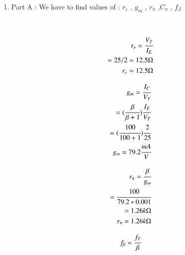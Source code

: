 \begin{enumerate}[label=\thesubsection.\arabic*.,ref=\thesubsection.\theenumi]
\item
Part A : We have to find values of :
 $r_{e}$ , $g_{m}$ , $r_{\pi}$ ,$C_{\pi}$ , $f_{\beta}$
 
\\

\solution

\begin{align}
   
   r_{e}  = \cfrac{V_{T}}{I_{E}}\\ 
          
          
          = 25/2  
          
          
          = 12.5\ohm \\
        
  
  r_{e} = 12.5 \ohm
    
\end{align}

\begin{align}

g_{m}   = \cfrac{I_{C}}{V_{T}}\\ 
        
        = (\cfrac{\beta}{\beta+1})\cfrac{I_{E}}{V_{T}}\\
    
        = (\cfrac{100}{100+1})\cfrac{2}{25}\\
        
        
        
        g_{m}=79.2 \cfrac{mA}{V}
        
\end{align}

\begin{align}

     r_{\pi}  = \cfrac{\beta}{g_{m}}\\
              
              = \cfrac{100}{79.2 * 0.001}\\
              
              = 1.26 k\ohm\\
              
               
        
     r_{\pi} = 1.26 k\ohm
     
\end{align}
        
        
\begin{align}
     
     f_{\beta} = \cfrac{f_{T}}{\beta}\\
               

\end{align}
\end{enumerate}
